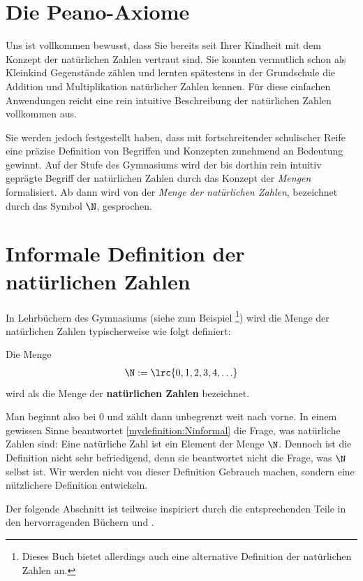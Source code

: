 \section{Die Peano-Axiome}
Uns ist vollkommen bewusst, dass Sie bereits seit Ihrer Kindheit mit dem Konzept der natürlichen Zahlen vertraut sind. Sie konnten vermutlich schon als Kleinkind Gegenstände zählen und lernten spätestens in der Grundschule die Addition und Multiplikation natürlicher Zahlen kennen. Für diese einfachen Anwendungen reicht eine rein intuitive Beschreibung der natürlichen Zahlen vollkommen aus.

Sie werden jedoch festgestellt haben, dass mit fortschreitender schulischer Reife eine präzise Definition von Begriffen und Konzepten zunehmend an Bedeutung gewinnt. Auf der Stufe des Gymnasiums wird der bis dorthin rein intuitiv geprägte Begriff der natürlichen Zahlen durch das Konzept der \textit{Mengen} formalisiert. Ab dann wird von der \textit{Menge der natürlichen Zahlen}, bezeichnet durch das Symbol $\N$, gesprochen.

\section{Informale Definition der natürlichen Zahlen}
In Lehrbüchern des Gymnasiums (siehe zum Beispiel \cite{ArminBarth}\footnote{Dieses Buch bietet allerdings auch eine alternative Definition der natürlichen Zahlen an.}) wird die Menge der natürlichen Zahlen typischerweise wie folgt definiert:
\begin{mydefinition}\label{mydefinition:Ninformal}
Die Menge
\begin{align*}
	\N := \lrc{0,1,2,3,4,\ldots}
\end{align*}
wird als die Menge der \textbf{natürlichen Zahlen} bezeichnet.
\end{mydefinition}
Man beginnt also bei $0$ und zählt dann unbegrenzt weit nach vorne. In einem gewissen Sinne beantwortet \cref{mydefinition:Ninformal} die Frage, was natürliche Zahlen sind: Eine natürliche Zahl ist ein Element der Menge $\N$. Dennoch ist die Definition nicht sehr befriedigend, denn sie beantwortet nicht die Frage, was $\N$ selbst ist. \cite{TerenceTao} Wir werden nicht von dieser Definition Gebrauch machen, sondern eine nützlichere Definition entwickeln.

Der folgende Abschnitt ist teilweise inspiriert durch die entsprechenden Teile in den hervorragenden Büchern \cite{TerenceTao} und \cite{AmannEscher1}.

